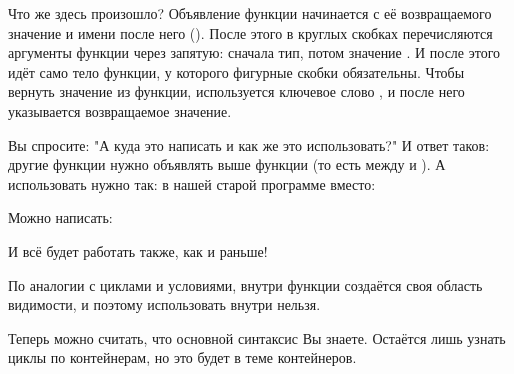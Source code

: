 
Что же здесь произошло? Объявление функции начинается с её возвращаемого значение и имени после него (). После этого в круглых скобках перечисляются аргументы функции через запятую: сначала тип, потом значение . И после этого идёт само тело функции, у которого фигурные скобки обязательны. Чтобы вернуть значение из функции, используется ключевое слово , и после него указывается возвращаемое значение.

Вы спросите: "А куда это написать и как же это использовать?" И ответ таков: другие функции нужно объявлять выше функции  (то есть между  и ). А использовать нужно так: в нашей старой программе вместо:


Можно написать:


И всё будет работать также, как и раньше!

По аналогии с циклами и условиями, внутри функции создаётся своя область видимости, и поэтому использовать  внутри  нельзя.

Теперь можно считать, что основной синтаксис Вы знаете. Остаётся лишь узнать циклы по контейнерам, но это будет в теме контейнеров.

